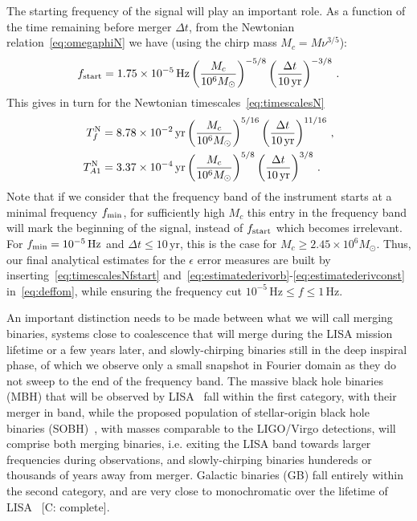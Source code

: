 \documentclass[aps,showpacs,twocolumn,
prd,superscriptaddress,nofootinbib]{revtex4-1}
\newcommand{\be}{\begin{equation}}
\newcommand{\ee}{\end{equation}}
\newcommand{\Hz}{\,\mathrm{Hz}}
\newcommand{\yr}{\,\mathrm{yr}}
\newcommand{\Msol}{M_{\odot}}
\newcommand{\Mchirp}{M_{c}}
\newcommand{\Tf}{T_{f}}
\newcommand{\SM}[1]{{\color{Red} #1}}
\begin{document}
The starting frequency of the signal will play an important role. As a function of the time remaining before merger $\Delta t$, from the Newtonian relation~\eqref{eq:omegaphiN} we have (using the chirp mass $\Mchirp = M \nu^{3/5}$):
\be\label{eq:fstartN}
	f_{\rm start} = 1.75\times 10^{-5} \Hz \left( \frac{\Mchirp}{10^{6}M_{\odot}} \right)^{-5/8} \left( \frac{\Delta t}{10 \yr} \right)^{-3/8} \,.
\ee
This gives in turn for the Newtonian timescales~\eqref{eq:timescalesN}
\begin{subequations}\label{eq:timescalesNfstart}
\begin{align}
	\Tf^{\rm N} &= 8.78\times10^{-2}\yr \left( \frac{\Mchirp}{10^{6}M_{\odot}} \right)^{5/16} \left( \frac{\Delta t}{10 \yr} \right)^{11/16} \,, \\
	T_{A1}^{\rm N} &= 3.37\times10^{-4}\yr \left( \frac{\Mchirp}{10^{6}M_{\odot}} \right)^{5/8} \left( \frac{\Delta t}{10 \yr} \right)^{3/8} \,.
\end{align}
\end{subequations}
Note that if we consider that the frequency band of the instrument starts at a minimal frequency $f_{\rm min}$, for sufficiently high $\Mchirp$ this entry in the frequency band will mark the beginning of the signal, instead of $f_{\rm start}$ which becomes irrelevant. For $f_{\rm min} = 10^{-5}\Hz$ and $\Delta t \leq 10\yr$, this is the case for $\Mchirp \geq 2.45\times 10^{6}\Msol $. Thus, our final analytical estimates for the $\epsilon$ error measures are built by inserting~\eqref{eq:timescalesNfstart} and~\eqref{eq:estimatederivorb}-\eqref{eq:estimatederivconst} in~\eqref{eq:deffom}, while ensuring the frequency cut $10^{-5}\Hz \leq f \leq 1\Hz$.

An important distinction needs to be made between what we will call merging binaries, systems close to coalescence that will merge during the LISA mission lifetime or a few years later, and slowly-chirping binaries still in the deep inspiral phase, of which we observe only a small snapshot in Fourier domain as they do not sweep to the end of the frequency band. The massive black hole binaries (MBH) that will be observed by LISA~\cite{LISA17} fall within the first category, with their merger in band, while the proposed population of stellar-origin black hole binaries (SOBH)~\cite{Sesana16}, with masses comparable to the LIGO/Virgo detections, will comprise both merging binaries, i.e. exiting the LISA band towards larger frequencies during observations, and slowly-chirping binaries hundereds or thousands of years away from merger. Galactic binaries (GB) fall entirely within the second category, and are very close to monochromatic over the lifetime of LISA~\cite{LISA17} \SM{[C: complete]}.
\end{document}
